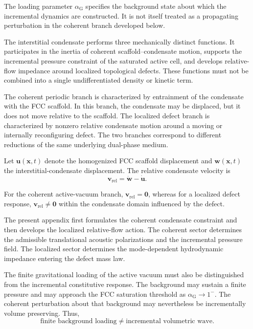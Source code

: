 The loading parameter $\alpha_{\mathrm{G}}$ specifies the background state about which the incremental dynamics are constructed. It is not itself treated as a propagating perturbation in the coherent branch developed below.

The interstitial condensate performs three mechanically distinct functions. It participates in the inertia of coherent scaffold--condensate motion, supports the incremental pressure constraint of the saturated active cell, and develops relative-flow impedance around localized topological defects. These functions must not be combined into a single undifferentiated density or kinetic term.

The coherent periodic branch is characterized by entrainment of the condensate with the FCC scaffold. In this branch, the condensate may be displaced, but it does not move relative to the scaffold. The localized defect branch is characterized by nonzero relative condensate motion around a moving or internally reconfiguring defect. The two branches correspond to different reductions of the same underlying dual-phase medium.

Let $\mathbf{u}(\mathbf{x},t)$ denote the homogenized FCC scaffold displacement and $\mathbf{w}(\mathbf{x},t)$ the interstitial-condensate displacement. The relative condensate velocity is
\begin{equation}
    \mathbf{v}_{\mathrm{rel}} = \dot{\mathbf{w}} - \dot{\mathbf{u}}.
\end{equation}

For the coherent active-vacuum branch, $\mathbf{v}_{\mathrm{rel}} = \mathbf{0}$, whereas for a localized defect response, $\mathbf{v}_{\mathrm{rel}} \neq \mathbf{0}$ within the condensate domain influenced by the defect.

The present appendix first formulates the coherent condensate constraint and then develops the localized relative-flow action. The coherent sector determines the admissible translational acoustic polarizations and the incremental pressure field. The localized sector determines the mode-dependent hydrodynamic impedance entering the defect mass law.

The finite gravitational loading of the active vacuum must also be distinguished from the incremental constitutive response. The background may sustain a finite pressure and may approach the FCC saturation threshold as $\alpha_{\mathrm{G}} \rightarrow 1^{-}$. The coherent perturbation about that background may nevertheless be incrementally volume preserving. Thus,
\begin{equation}
    \text{finite background loading} \neq \text{incremental volumetric wave}.
\end{equation}

